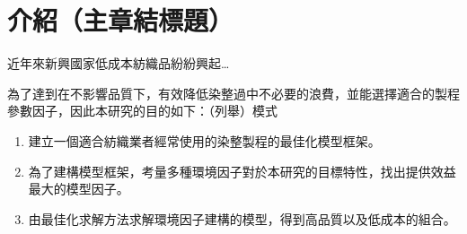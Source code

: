 \chapter{介紹（主章結標題）}
\label{c:intro} %
近年來新興國家低成本紡織品紛紛興起\dots

為了達到在不影響品質下，有效降低染整過中不必要的浪費，並能選擇適合的製程參數因子，因此本研究的目的如下：（列舉）模式
\begin{enumerate}[(1)]
	\item 建立一個適合紡織業者經常使用的染整製程的最佳化模型框架。
	\item 為了建構模型框架，考量多種環境因子對於本研究的目標特性，找出提供效益最大的模型因子。
	\item 由最佳化求解方法求解環境因子建構的模型，得到高品質以及低成本的組合。
\end{enumerate}


